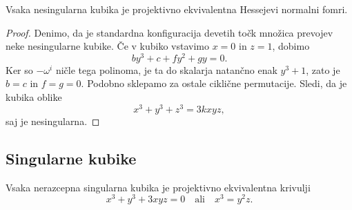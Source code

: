 
\begin{izrek}
Vsaka nesingularna kubika je projektivno ekvivalentna Hessejevi
normalni fomri.
\end{izrek}

\begin{proof}
Denimo, da je standardna konfiguracija devetih točk množica
prevojev neke nesingularne kubike. Če v kubiko vstavimo $x = 0$ in
$z = 1$, dobimo
\[
by^3 + c + fy^2 + gy = 0.
\]
Ker so $-\omega^i$ ničle tega polinoma, je ta do skalarja natančno
enak $y^3 + 1$, zato je $b = c$ in $f = g = 0$. Podobno sklepamo za
ostale ciklične permutacije. Sledi, da je kubika oblike
\[
x^3 + y^3 + z^3 = 3kxyz,
\]
saj je nesingularna.
\end{proof}

\newpage

\subsection{Singularne kubike}

\begin{izrek}
Vsaka nerazcepna singularna kubika je projektivno ekvivalentna
krivulji
\[
x^3 + y^3 + 3xyz = 0
\quad \text{ali} \quad
x^3 = y^2z.
\]
\end{izrek}

